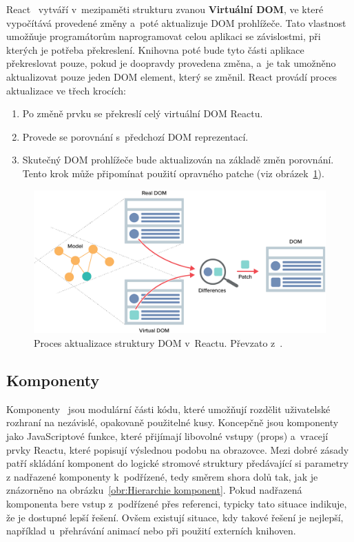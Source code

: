 React~\cite{book:LearningReact, article:BeginnersGuideToReact} vytváří v~mezipaměti strukturu zvanou \textbf{Virtuální DOM}, ve které vypočítává provedené změny a~poté aktualizuje DOM prohlížeče. Tato vlastnost umožňuje programátorům naprogramovat celou aplikaci se závislostmi, při kterých je potřeba překreslení. Knihovna poté bude tyto části aplikace překreslovat pouze, pokud je doopravdy provedena změna, a~je tak umožněno aktualizovat pouze jeden DOM element, který se změnil. React provádí proces aktualizace ve třech krocích:
\begin{enumerate}
    \item Po změně prvku se překreslí celý virtuální DOM Reactu.
    \item Provede se porovnání s~předchozí DOM reprezentací.
    \item Skutečný DOM prohlížeče bude aktualizován na základě změn porovnání. Tento krok může připomínat použití opravného patche (viz obrázek~\ref{obr:Porovnani DOMu}).
\end{enumerate}

\begin{figure}[hbt]
	\centering
	\setlength{\fboxsep}{0pt}
	\includegraphics[width=1\textwidth]{obrazky-figures/porovnani_DOMu.png}
	\caption{Proces aktualizace struktury DOM v~Reactu. Převzato z~\cite{article:BeginnersGuideToReact}.}
	\label{obr:Porovnani DOMu}
\end{figure}

\subsection*{Komponenty}
\label{sec:Komponenty}
Komponenty~\cite{article:BeginnersGuideToReact} jsou modulární části kódu, které umožňují rozdělit uživatelské rozhraní na nezávislé, opakovaně použitelné kusy. Koncepčně jsou komponenty jako JavaScriptové funkce, které přijímají libovolné vstupy (props) a~vracejí prvky Reactu, které popisují výslednou podobu na obrazovce. Mezi dobré zásady patří skládání komponent do logické stromové struktury předávající si parametry z nadřazené komponenty k~podřízené, tedy směrem shora dolů tak, jak je znázorněno na obrázku~\ref{obr:Hierarchie komponent}. Pokud nadřazená komponenta bere vstup z~podřízené přes referenci, typicky tato situace indikuje, že je dostupné lepší řešení. Ovšem existují situace, kdy takové řešení je nejlepší, například u~přehrávání animací nebo při použití externích knihoven.

